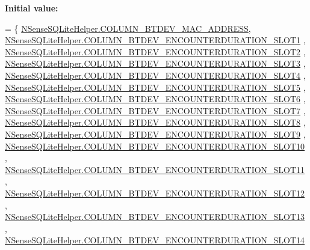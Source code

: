 {\bfseries Initial value\-:}
\begin{DoxyCode}
= \{ 
            \hyperlink{classcs_1_1nsense_1_1db_1_1_n_sense_s_q_lite_helper_a66d760b81948efc86eafb0bb5147c2a5}{NSenseSQLiteHelper.COLUMN\_BTDEV\_MAC\_ADDRESS},
            \hyperlink{classcs_1_1nsense_1_1db_1_1_n_sense_s_q_lite_helper_a76beab73c4c6dca4fc15c556da95a7c2}{NSenseSQLiteHelper.COLUMN\_BTDEV\_ENCOUNTERDURATION\_SLOT1}
      ,
            \hyperlink{classcs_1_1nsense_1_1db_1_1_n_sense_s_q_lite_helper_a04ffdeacd409f6b6b262eef50f604ad0}{NSenseSQLiteHelper.COLUMN\_BTDEV\_ENCOUNTERDURATION\_SLOT2}
      ,
            \hyperlink{classcs_1_1nsense_1_1db_1_1_n_sense_s_q_lite_helper_ac14029ad8e6146869a054ab91a60feb3}{NSenseSQLiteHelper.COLUMN\_BTDEV\_ENCOUNTERDURATION\_SLOT3}
      ,
            \hyperlink{classcs_1_1nsense_1_1db_1_1_n_sense_s_q_lite_helper_ac7af5b84e77b2347356b23528559710b}{NSenseSQLiteHelper.COLUMN\_BTDEV\_ENCOUNTERDURATION\_SLOT4}
      ,
            \hyperlink{classcs_1_1nsense_1_1db_1_1_n_sense_s_q_lite_helper_afb2a5bc1f52052963cba23e23925ceca}{NSenseSQLiteHelper.COLUMN\_BTDEV\_ENCOUNTERDURATION\_SLOT5}
      ,
            \hyperlink{classcs_1_1nsense_1_1db_1_1_n_sense_s_q_lite_helper_a5498bb02155437579e204a588d142230}{NSenseSQLiteHelper.COLUMN\_BTDEV\_ENCOUNTERDURATION\_SLOT6}
      ,
            \hyperlink{classcs_1_1nsense_1_1db_1_1_n_sense_s_q_lite_helper_acdaa8699a82f7ea888a163130e00b0f6}{NSenseSQLiteHelper.COLUMN\_BTDEV\_ENCOUNTERDURATION\_SLOT7}
      ,
            \hyperlink{classcs_1_1nsense_1_1db_1_1_n_sense_s_q_lite_helper_a8c6784f810d8c7bb70d0864e9c389f43}{NSenseSQLiteHelper.COLUMN\_BTDEV\_ENCOUNTERDURATION\_SLOT8}
      ,
            \hyperlink{classcs_1_1nsense_1_1db_1_1_n_sense_s_q_lite_helper_a67878d3b8c7fd4fef8e3a50147ee8f80}{NSenseSQLiteHelper.COLUMN\_BTDEV\_ENCOUNTERDURATION\_SLOT9}
      ,
            \hyperlink{classcs_1_1nsense_1_1db_1_1_n_sense_s_q_lite_helper_a7a292db5cf93e4b1583ca56267cabaab}{NSenseSQLiteHelper.COLUMN\_BTDEV\_ENCOUNTERDURATION\_SLOT10}
      ,
            \hyperlink{classcs_1_1nsense_1_1db_1_1_n_sense_s_q_lite_helper_a2a7d11fcb1f954f0cda9b0b5488d7f72}{NSenseSQLiteHelper.COLUMN\_BTDEV\_ENCOUNTERDURATION\_SLOT11}
      ,
            \hyperlink{classcs_1_1nsense_1_1db_1_1_n_sense_s_q_lite_helper_a97ea5d9c1ef3e460d54e87a12b1475fe}{NSenseSQLiteHelper.COLUMN\_BTDEV\_ENCOUNTERDURATION\_SLOT12}
      ,
            \hyperlink{classcs_1_1nsense_1_1db_1_1_n_sense_s_q_lite_helper_a91ca35edc69c8784edc52e460e404538}{NSenseSQLiteHelper.COLUMN\_BTDEV\_ENCOUNTERDURATION\_SLOT13}
      ,
            \hyperlink{classcs_1_1nsense_1_1db_1_1_n_sense_s_q_lite_helper_a31c1166964baa1fdf97a97a9f72ac07e}{NSenseSQLiteHelper.COLUMN\_BTDEV\_ENCOUNTERDURATION\_SLOT14}

\end{DoxyCode}
